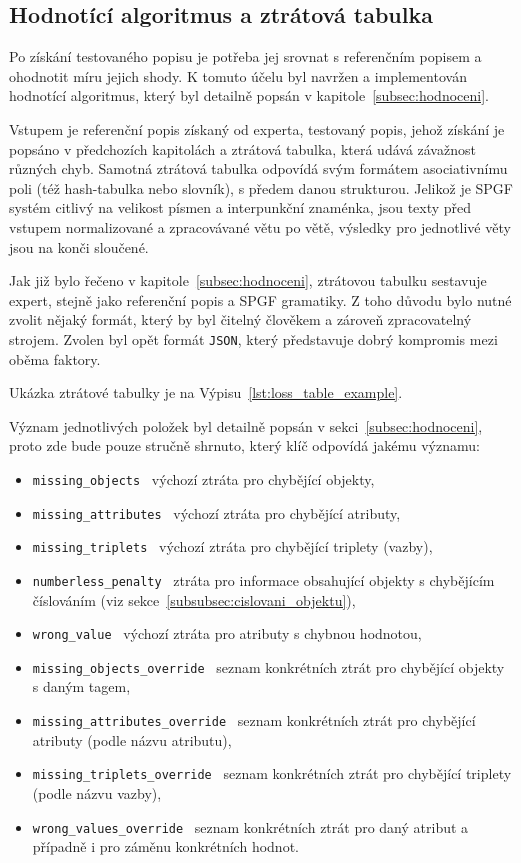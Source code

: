 \subsection{Hodnotící algoritmus a ztrátová tabulka}
Po získání testovaného popisu je potřeba jej srovnat s referenčním popisem a ohodnotit míru jejich shody.
K tomuto účelu byl navržen a implementován hodnotící algoritmus, který byl detailně popsán v kapitole~\ref{subsec:hodnoceni}.

Vstupem je referenční popis získaný od experta, testovaný popis, jehož získání je popsáno v předchozích kapitolách a ztrátová tabulka,
která udává závažnost různých chyb.
Samotná ztrátová tabulka odpovídá svým formátem asociativnímu poli (též hash-tabulka nebo slovník), s předem danou strukturou.
Jelikož je SPGF systém citlivý na velikost písmen a interpunkční znaménka, jsou texty před vstupem normalizované
a zpracovávané větu po větě, výsledky pro jednotlivé věty jsou na konči sloučené.

Jak již bylo řečeno v kapitole~\ref{subsec:hodnoceni}, ztrátovou tabulku sestavuje expert, stejně jako referenční popis a SPGF gramatiky.
Z toho důvodu bylo nutné zvolit nějaký formát, který by byl čitelný člověkem a zároveň zpracovatelný strojem.
Zvolen byl opět formát \texttt{JSON}, který představuje dobrý kompromis mezi oběma faktory.

Ukázka ztrátové tabulky je na Výpisu~\ref{lst:loss_table_example}.

\newpage


Význam jednotlivých položek byl detailně popsán v sekci~\ref{subsec:hodnoceni}, proto zde bude pouze stručně shrnuto,
který klíč odpovídá jakému významu:
\begin{itemize}
	\item \texttt{missing\_objects} \to\ výchozí ztráta pro chybějící objekty,
	\item \texttt{missing\_attributes} \to\ výchozí ztráta pro chybějící atributy,
	\item \texttt{missing\_triplets} \to\ výchozí ztráta pro chybějící triplety (vazby),
	\item \texttt{numberless\_penalty} \to\ ztráta pro informace obsahující objekty s chybějícím číslováním (viz sekce~\ref{subsubsec:cislovani_objektu}),
	\item \texttt{wrong\_value} \to\ výchozí ztráta pro atributy s chybnou hodnotou,
	\item \texttt{missing\_objects\_override} \to\ seznam konkrétních ztrát pro chybějící objekty s daným tagem,
	\item \texttt{missing\_attributes\_override} \to\ seznam konkrétních ztrát pro chybějící atributy (podle názvu atributu),
	\item \texttt{missing\_triplets\_override} \to\ seznam konkrétních ztrát pro chybějící triplety (podle názvu vazby),
	\item \texttt{wrong\_values\_override} \to\ seznam konkrétních ztrát pro daný atribut a případně i pro záměnu konkrétních hodnot.
\end{itemize}

